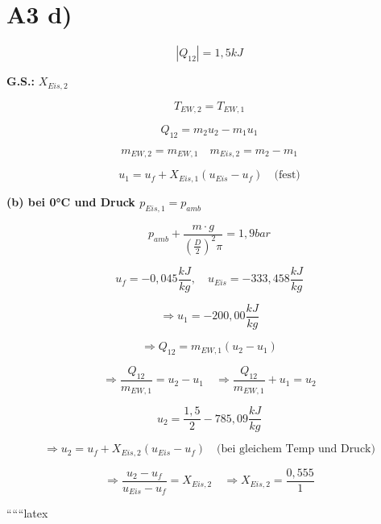 \section*{A3 d)}

\[
\left|Q_{12}\right| = 1,5 kJ
\]

\textbf{G.S.:} $X_{Eis,2}$

\[
T_{EW,2} = T_{EW,1}
\]

\[
Q_{12} = m_2 u_2 - m_1 u_1
\]

\[
m_{EW,2} = m_{EW,1} \quad m_{Eis,2} = m_2 - m_1
\]

\[
u_1 = u_f + X_{Eis,1} (u_{Eis} - u_f) \quad \text{(fest)}
\]

\textbf{(b) bei 0°C und Druck $p_{Eis,1} = p_{amb}$}

\[
p_{amb} + \frac{m \cdot g}{\left(\frac{D}{2}\right)^2 \pi} = 1,9 bar
\]

\[
u_f = -0,045 \frac{kJ}{kg}, \quad u_{Eis} = -333,458 \frac{kJ}{kg}
\]

\[
\Rightarrow u_1 = -200,00 \frac{kJ}{kg}
\]

\[
\Rightarrow Q_{12} = m_{EW,1} (u_2 - u_1)
\]

\[
\Rightarrow \frac{Q_{12}}{m_{EW,1}} = u_2 - u_1 \quad \Rightarrow \frac{Q_{12}}{m_{EW,1}} + u_1 = u_2
\]

\[
u_2 = \frac{1,5}{2} - 785,09 \frac{kJ}{kg}
\]

\[
\Rightarrow u_2 = u_f + X_{Eis,2} (u_{Eis} - u_f) \quad \text{(bei gleichem Temp und Druck)}
\]

\[
\Rightarrow \frac{u_2 - u_f}{u_{Eis} - u_f} = X_{Eis,2} \quad \Rightarrow X_{Eis,2} = \frac{0,555}{1}
\]

``````latex